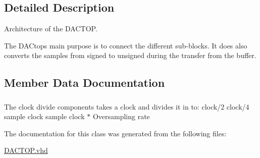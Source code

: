 \subsection{Detailed Description}
Architecture of the D\-A\-C\-T\-O\-P. 

The D\-A\-Ctops main purpose is to connect the different sub-\/blocks. It does also converts the samples from signed to unsigned during the transfer from the buffer. 

\subsection{Member Data Documentation}
\hypertarget{classdacTop_1_1behavioral_a904d954c80fa4089ba9eeeb9497214f2}{
\subsubsection[{clk\-\_\-divide}]{ {\bfseries \textcolor{vhdlchar}{ }} \hspace{0.3cm}{\ttfamily [Component]}}}\label{classdacTop_1_1behavioral_a904d954c80fa4089ba9eeeb9497214f2}
The clock divide components takes a clock and divides it in to\-: clock/2 clock/4 sample clock sample clock $\ast$ Oversampling rate 

The documentation for this class was generated from the following files\-:\begin{DoxyCompactItemize}
\item 
\hyperlink{DACTOP_8vhd}{D\-A\-C\-T\-O\-P.\-vhd}\end{DoxyCompactItemize}
